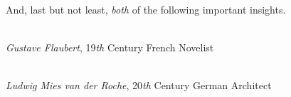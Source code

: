And, last but not least, {\em both} of the following important insights.
\begin{itemize}
\begin{item}
 \\
{\em Gustave Flaubert}, 19{\em th} Century French Novelist
\\
\end{item}
\begin{item}
\\
{\em Ludwig Mies van der Roche}, 20{\em th} Century German Architect
\end{item}
\end{itemize}

\newpage
%
%
